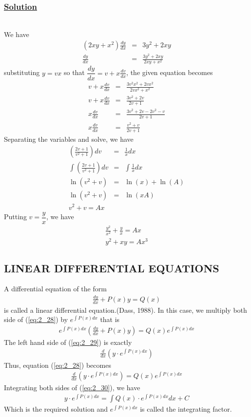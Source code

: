 \documentclass[11pt]{report}
\newcommand{\ubt}[1]{\textbf{\underline{#1}}}
\newcommand{\sps}{\\[0.2cm]}
\newcommand{\spn}[1]{\\[#1cm]}
\newcommand{\refn}[1]{(\ref{#1})}
\newcommand{\refx}[1]{\refn{eq:#1}}
\newcommand{\dsp}{\displaystyle}
\newcommand{\solution}{\subsubsection{\ubt{Solution}}{~}\spn{-1}}
\begin{document}
	\solution
	We have
	\begin{eqnarray*}
			(2xy + x^2)\frac{dy}{dx} &=& 3y^2 + 2xy\sps
			\frac{dy}{dx} &=& \frac{3y^2 + 2xy}{2xy + x^2}
	\end{eqnarray*}
	substituting $y=vx$ so that $\dfrac{dy}{dx}=v + x\frac{dv}{dx}$, the given equation becomes
	\begin{eqnarray*}
		v + x\frac{dv}{dx} &=& \frac{3v^2 x^2 + 2vx^2}{2vx^2 + x^2}\sps
		v + x\frac{dv}{dx} &=& \frac{3v^2 + 2v}{2v + 1}\sps
		x\frac{dv}{dx} &=& \frac{3v^2 + 2v - 2v^2 - v}{2v + 1}\sps
		x\frac{dv}{dx} &=& \frac{v^2 + v}{2v + 1}
	\end{eqnarray*}
	Separating the variables and solve, we have
	\begin{eqnarray*}
		\left(\frac{2v+1}{v^2+1}\right)dv &=& \frac{1}{x}dx\sps
		\int\left(\frac{2v+1}{v^2+1}\right)dv &=& \int \frac{1}{x}dx\sps
		\ln(v^2 + v) &=& \ln(x) + \ln(A)\sps
		\ln(v^2+v) &=& \ln(xA)\sps
		v^2+v = Ax
	\end{eqnarray*}
	Putting $v = \dfrac{y}{x}$, we have
	\begin{eqnarray*}
		\frac{y^2}{x^2} + \frac{y}{x} = Ax\sps
		y^2 + xy = Ax^3
	\end{eqnarray*}
	
	\subsection{LINEAR DIFFERENTIAL EQUATIONS}
	A differential equation of the form
	\begin{eqnarray}
		\frac{dy}{dx} + P(x)y = Q(x) \label{eq:2_28}
	\end{eqnarray}
	is called a linear differential equation.(Dass, 1988). In this case, we multiply both side of \refx{2_28} by $\dsp e^{\int P(x)dx}$ that is
	\begin{eqnarray}
		e^{\int P(x)dx}\left(\frac{dy}{dx} + P(x)y\right)= Q(x)e^{\int P(x)dx}\label{eq:2_29}
	\end{eqnarray}
	The left hand side of \refx{2_29} is exactly 
	\begin{eqnarray*}
		\frac{d}{dx}\left(y\cdot e^{\int P(x)dx} \right)
	\end{eqnarray*}
	Thus, equation \refx{2_28} becomes
	\begin{eqnarray}
		\frac{d}{dx}\left(y\cdot e^{\int P(x)dx} \right) = Q(x)e^{\int P(x)dx}\label{eq:2_30}
	\end{eqnarray}
	Integrating both sides of \refx{2_30}, we have
	\begin{eqnarray*}
		y\cdot e^{\int P(x)dx} = \int Q(x)\cdot e^{\int P(x)dx} dx + C
	\end{eqnarray*}
	Which is the required solution and $e^{\int P(x)dx}$ is called the integrating factor.
	
\end{document}
